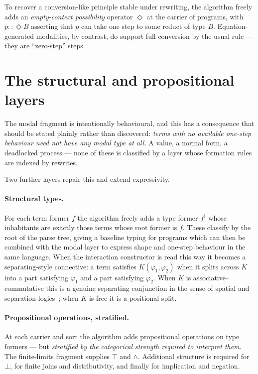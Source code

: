 To recover a conversion-like principle stable under rewriting, the algorithm freely adds
an \emph{empty-context possibility} operator $\Diamond$ at the carrier of programs, with
$p :: \Diamond B$ asserting that $p$ can take one step to some reduct of type $B$.
Equation-generated modalities, by contrast, do support full conversion by the usual rule ---
they are ``zero-step'' steps.

\section{The structural and propositional layers}

The modal fragment is intentionally behavioural, and this has a consequence that should
be stated plainly rather than discovered: \emph{terms with no available one-step behaviour
need not have any modal type at all.} A value, a normal form, a deadlocked process ---
none of these is classified by a layer whose formation rules are indexed by rewrites.

Two further layers repair this and extend expressivity.

\paragraph{Structural types.} For each term former $f$ the algorithm freely adds a type
former $f^\sharp$ whose inhabitants are exactly those terms whose root former is $f$.
These classify by the root of the parse tree, giving a baseline typing for programs which
can then be combined with the modal layer to express shape and one-step behaviour in the
same language. When the interaction constructor is read this way it becomes a
separating-style connective: a term satisfies $K(\varphi_1,\varphi_2)$ when it splits
across $K$ into a part satisfying $\varphi_1$ and a part satisfying $\varphi_2$. When $K$
is associative--commutative this is a genuine separating conjunction in the sense of
spatial and separation logics~\cite{CairesCardelli,Reynolds2002}; when $K$ is free it
is a positional split.

\paragraph{Propositional operations, stratified.} At each carrier and sort the algorithm
adds propositional operations on type formers --- but \emph{stratified by the categorical
strength required to interpret them}. The finite-limits fragment supplies $\top$ and
$\wedge$. Additional structure is required for $\bot$, for finite joins and
distributivity, and finally for implication and negation.

